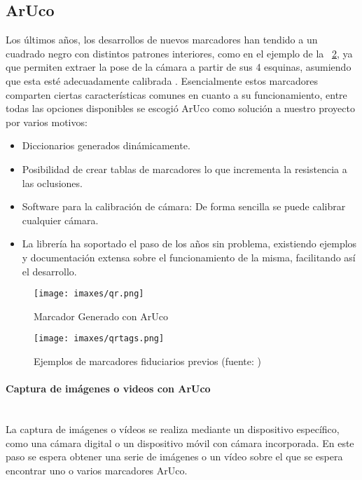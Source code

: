 \subsection{ArUco}
Los últimos años, los desarrollos de nuevos marcadores han tendido a un cuadrado negro con distintos patrones interiores, como en el ejemplo de la \figurename~\ref{fig:qrtags}, ya que permiten extraer la pose de la cámara a partir de sus 4 esquinas, asumiendo que esta esté adecuadamente calibrada \cite{GarridoJurado2014}. Esencialmente estos marcadores comparten ciertas características comunes en cuanto a su funcionamiento, entre todas las opciones disponibles se escogió ArUco como solución a nuestro proyecto por varios motivos:
\begin{itemize}
    \item Diccionarios generados dinámicamente.
    \item Posibilidad de crear tablas de marcadores lo que incrementa la resistencia a las oclusiones.
    \item Software para la calibración de cámara: De forma sencilla se puede calibrar cualquier cámara.
    \item La librería ha soportado el paso de los años sin problema, existiendo ejemplos y documentación extensa sobre el funcionamiento de la misma, facilitando así el desarrollo.
\end{itemize}

\begin{figure}
  \centering
  \texttt{[image: imaxes/qr.png]}
  \caption{Marcador Generado con ArUco}
  \label{fig:qr}
\end{figure}

\begin{figure}
  \centering
  \texttt{[image: imaxes/qrtags.png]}
  \caption{Ejemplos de marcadores fiduciarios previos (fuente: \cite{GarridoJurado2014})}
  \label{fig:qrtags}
\end{figure}


\paragraph{Captura de imágenes o videos con ArUco}~\\
La captura de imágenes o vídeos se realiza mediante un dispositivo específico, como una cámara digital o un dispositivo móvil con cámara incorporada. En este paso se espera obtener una serie de imágenes o un vídeo sobre el que se espera encontrar uno o varios marcadores ArUco.
